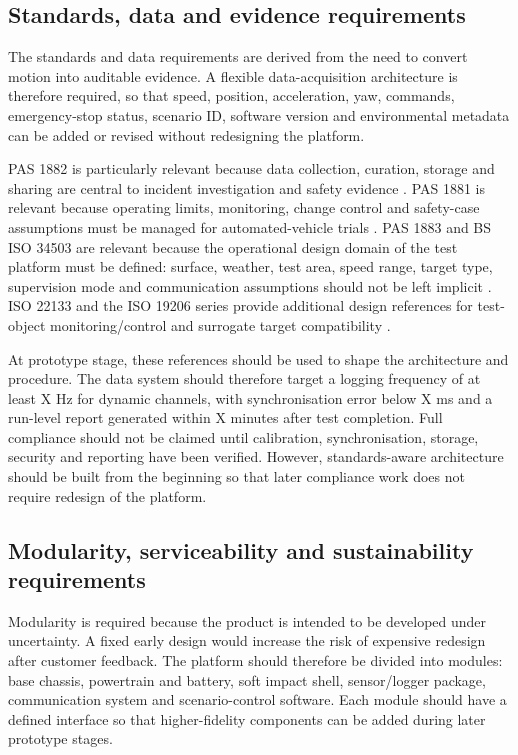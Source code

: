 \subsection{Standards, data and evidence requirements}
\label{sec:ch8_standards_data_requirements}

The standards and data requirements are derived from the need to convert motion into auditable evidence. A flexible data-acquisition architecture is therefore required, so that speed, position, acceleration, yaw, commands, emergency-stop status, scenario ID, software version and environmental metadata can be added or revised without redesigning the platform.

PAS 1882 is particularly relevant because data collection, curation, storage and sharing are central to incident investigation and safety evidence \parencite{bsiPAS1882}. PAS 1881 is relevant because operating limits, monitoring, change control and safety-case assumptions must be managed for automated-vehicle trials \parencite{bsiPAS1881}. PAS 1883 and BS ISO 34503 are relevant because the operational design domain of the test platform must be defined: surface, weather, test area, speed range, target type, supervision mode and communication assumptions should not be left implicit \parencite{bsiPAS1883,iso34503}. ISO 22133 and the ISO 19206 series provide additional design references for test-object monitoring/control and surrogate target compatibility \parencite{iso22133,iso19206series}.

At prototype stage, these references should be used to shape the architecture and procedure. The data system should therefore target a logging frequency of at least X Hz for dynamic channels, with synchronisation error below X ms and a run-level report generated within X minutes after test completion. Full compliance should not be claimed until calibration, synchronisation, storage, security and reporting have been verified. However, standards-aware architecture should be built from the beginning so that later compliance work does not require redesign of the platform.

\subsection{Modularity, serviceability and sustainability requirements}
\label{sec:ch8_modularity_serviceability_requirements}

Modularity is required because the product is intended to be developed under uncertainty. A fixed early design would increase the risk of expensive redesign after customer feedback. The platform should therefore be divided into modules: base chassis, powertrain and battery, soft impact shell, sensor/logger package, communication system and scenario-control software. Each module should have a defined interface so that higher-fidelity components can be added during later prototype stages.

